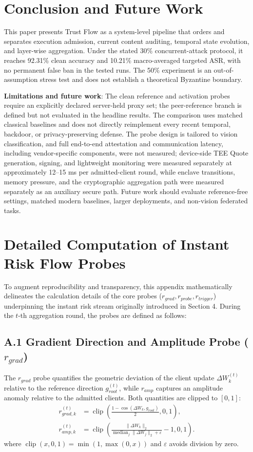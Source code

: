 \documentclass[11pt, a4paper]{article}
\begin{document}
\section{Conclusion and Future Work}
This paper presents Trust Flow as a system-level pipeline that orders and
separates execution admission, current content auditing, temporal state
evolution, and layer-wise aggregation. Under the stated 30\% concurrent-attack
protocol, it reaches 92.31\% clean accuracy and 10.21\% macro-averaged targeted
ASR, with no permanent false ban in the tested runs. The 50\% experiment is an
out-of-assumption stress test and does not establish a theoretical Byzantine
boundary.

\textbf{Limitations and future work}: The clean reference and activation probes
require an explicitly declared server-held proxy set; the peer-reference
branch is defined but not evaluated in the headline results. The comparison
uses matched classical baselines and does not directly reimplement every recent
temporal, backdoor, or privacy-preserving defense. The probe design is tailored
to vision classification, and full end-to-end attestation and communication
latency, including vendor-specific components, were not measured; device-side
TEE Quote generation, signing, and lightweight monitoring were measured
separately at approximately 12--15 ms per admitted-client round, while enclave
transitions, memory pressure, and the cryptographic aggregation path were
measured separately as an auxiliary secure path. Future work should evaluate
reference-free settings, matched modern baselines, larger deployments, and
non-vision federated tasks.

\appendix
\section{Detailed Computation of Instant Risk Flow Probes}
To augment reproducibility and transparency, this appendix mathematically delineates the calculation details of the core probes ($r_{grad}, r_{probe}, r_{trigger}$) underpinning the instant risk stream originally introduced in Section 4. During the $t$-th aggregation round, the probes are defined as follows:

\subsection{A.1 Gradient Direction and Amplitude Probe \texorpdfstring{($r_{grad}$)}{(r-grad)}}
The $r_{grad}$ probe quantifies the geometric deviation of the client update $\Delta W_k^{(t)}$ relative to the reference direction $g_{root}^{(t)}$, while $r_{amp}$ captures an amplitude anomaly relative to the admitted clients. Both quantities are clipped to $[0,1]$:
\begin{align}
 r_{grad,k}^{(t)}&=\operatorname{clip}\!\left(
 \frac{1-\cos(\Delta W_k,g_{root})}{2},0,1\right),\\
 r_{amp,k}^{(t)}&=\operatorname{clip}\!\left(
 \frac{\|\Delta W_k\|_2}{\operatorname{median}_j\|\Delta W_j\|_2+\varepsilon}
 -1,0,1\right).
\end{align}
where $\operatorname{clip}(x,0,1)=\min(1,\max(0,x))$ and $\varepsilon$ avoids division by zero.
\end{document}
